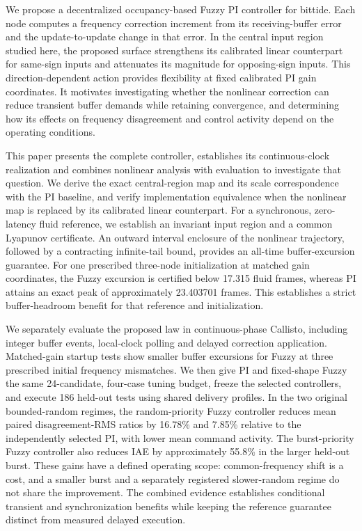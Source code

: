 We propose a decentralized occupancy-based Fuzzy PI controller for bittide. Each node computes a frequency correction increment from its receiving-buffer error and the update-to-update change in that error. In the central input region studied here, the proposed surface strengthens its calibrated linear counterpart for same-sign inputs and attenuates its magnitude for opposing-sign inputs. This direction-dependent action provides flexibility at fixed calibrated PI gain coordinates. It motivates investigating whether the nonlinear correction can reduce transient buffer demands while retaining convergence, and determining how its effects on frequency disagreement and control activity depend on the operating conditions.

This paper presents the complete controller, establishes its con\-tinuous-clock realization and combines nonlinear analysis with evaluation to investigate that question. We derive the exact central-region map and its scale correspondence with the PI baseline, and verify implementation equivalence when the nonlinear map is replaced by its calibrated linear counterpart. For a synchronous, zero-latency fluid reference, we establish an invariant input region and a common Lyapunov certificate. An outward interval enclosure of the nonlinear trajectory, followed by a contracting infinite-tail bound, provides an all-time buffer-excursion guarantee. For one prescribed three-node initialization at matched gain coordinates, the Fuzzy excursion is certified below 17.315 fluid frames, whereas PI attains an exact peak of approximately 23.403701 frames. This establishes a strict buffer-headroom benefit for that reference and initialization.

We separately evaluate the proposed law in continuous-phase Callisto,
including integer buffer events, local-clock polling and delayed
correction application. Matched-gain startup tests show smaller buffer
excursions for Fuzzy at three prescribed initial frequency mismatches.
We then give PI and fixed-shape Fuzzy the same 24-candidate,
four-case tuning budget, freeze the selected controllers, and execute
186 held-out tests using shared delivery profiles. In the two
original bounded-random regimes, the random-priority Fuzzy controller
reduces mean paired disagreement-RMS ratios by 16.78\% and 7.85\%
relative to the independently selected PI, with lower mean command
activity. The burst-priority Fuzzy controller also reduces IAE by
approximately 55.8\% in the larger held-out burst. These gains have
a defined operating scope: common-frequency shift is a cost, and a
smaller burst and a separately registered slower-random regime do not
share the improvement. The combined evidence establishes conditional
transient and synchronization benefits while keeping the reference
guarantee distinct from measured delayed execution.

